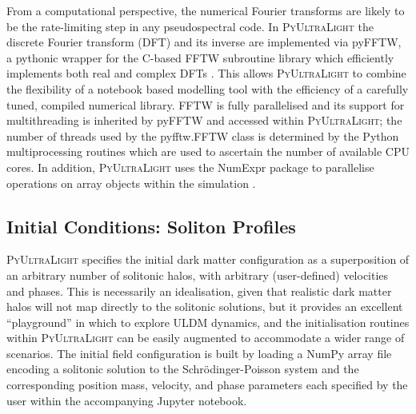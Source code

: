 \documentclass[a4paper,11pt]{article}
\newcommand{\PyUltraLight}{\textsc{PyUltraLight}\xspace}
\begin{document}
From a computational perspective, the numerical Fourier transforms are likely to be the rate-limiting step in any pseudospectral code. In \PyUltraLight the discrete Fourier transform (DFT) and its inverse are implemented via pyFFTW, a pythonic wrapper for the C-based FFTW subroutine library which efficiently implements both real and complex DFTs \cite{pyfftw,fftw,Frigo2005}. This  allows  \PyUltraLight  to combine the flexibility of a notebook based modelling tool with the efficiency of a carefully tuned, compiled numerical library.  FFTW is fully parallelised and its support for multithreading  is inherited by pyFFTW and accessed within \PyUltraLight; the number of threads used by the pyfftw.FFTW class is determined by the  Python multiprocessing routines which are used to ascertain the number of available CPU cores. In addition, \PyUltraLight uses the NumExpr package to parallelise operations on array objects within the simulation \cite{numexpr}. 

\subsection{Initial Conditions: Soliton Profiles}\label{sec:soliton-profiles}

\PyUltraLight specifies the initial dark matter configuration as a superposition of an arbitrary number of solitonic halos, with arbitrary (user-defined) velocities and phases. This is necessarily an idealisation, given that realistic dark matter halos will not map directly to the solitonic solutions, but it provides an excellent ``playground'' in which to explore ULDM dynamics, and the initialisation routines within \PyUltraLight can be easily augmented to accommodate a wider range of scenarios. The initial field configuration is built by loading a NumPy array file encoding a solitonic solution to the Schr{\"o}dinger-Poisson system and the corresponding position mass, velocity, and phase parameters each specified by the user within the accompanying Jupyter notebook. 
\end{document}
